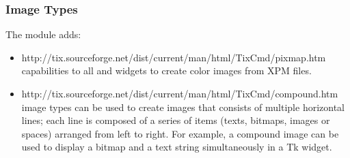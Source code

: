 



\subsubsection{Image Types}

The  module adds:
\begin{itemize}
\item 
{}
{http://tix.sourceforge.net/dist/current/man/html/TixCmd/pixmap.htm}
capabilities to all  and  widgets to
create color images from XPM files.



\item
{}
{http://tix.sourceforge.net/dist/current/man/html/TixCmd/compound.htm}
image types can be used to create images that consists of multiple
horizontal lines; each line is composed of a series of items (texts,
bitmaps, images or spaces) arranged from left to right. For example, a
compound image can be used to display a bitmap and a text string
simultaneously in a Tk  widget.




\end{itemize}



